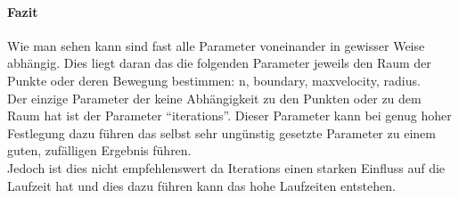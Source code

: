 \paragraph{Fazit}
Wie man sehen kann sind fast alle Parameter voneinander in gewisser Weise abhängig. Dies liegt daran das die folgenden Parameter jeweils den Raum der Punkte oder deren Bewegung bestimmen: n, boundary, maxvelocity, radius.\\
Der einzige Parameter der keine Abhängigkeit zu den Punkten oder zu dem Raum hat ist der Parameter \enquote{iterations}. Dieser Parameter kann bei genug hoher Festlegung dazu führen das selbst sehr ungünstig gesetzte Parameter zu einem guten, zufälligen Ergebnis führen.\\
Jedoch ist dies nicht empfehlenswert da Iterations einen starken Einfluss auf die Laufzeit hat und dies dazu führen kann das hohe Laufzeiten entstehen.